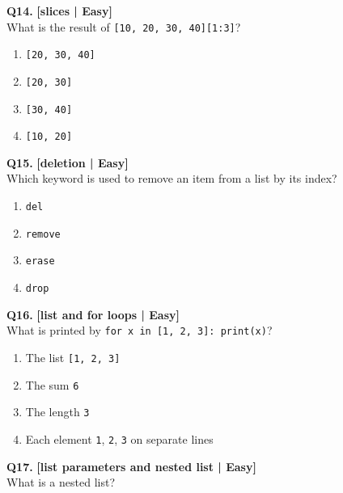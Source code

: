 \noindent\textbf{Q14.} \hfill {\small\color{LPUOrange}\textbf{[slices | Easy]}}\\[2pt]
What is the result of \texttt{[10, 20, 30, 40][1:3]}?

\begin{enumerate}[label=(\alph*),topsep=2pt,itemsep=1pt,partopsep=0pt,parsep=0pt]
    \item \relax \texttt{[20, 30, 40]}
    \item \relax \texttt{[20, 30]}
    \item \relax \texttt{[30, 40]}
    \item \relax \texttt{[10, 20]}
\end{enumerate}
\vspace{2mm}

\noindent\textbf{Q15.} \hfill {\small\color{LPUOrange}\textbf{[deletion | Easy]}}\\[2pt]
Which keyword is used to remove an item from a list by its index?

\begin{enumerate}[label=(\alph*),topsep=2pt,itemsep=1pt,partopsep=0pt,parsep=0pt]
    \item \relax \texttt{del}
    \item \relax \texttt{remove}
    \item \relax \texttt{erase}
    \item \relax \texttt{drop}
\end{enumerate}
\vspace{2mm}

\noindent\textbf{Q16.} \hfill {\small\color{LPUOrange}\textbf{[list and for loops | Easy]}}\\[2pt]
What is printed by \texttt{for x in [1, 2, 3]: print(x)}?

\begin{enumerate}[label=(\alph*),topsep=2pt,itemsep=1pt,partopsep=0pt,parsep=0pt]
    \item \relax The list \texttt{[1, 2, 3]}
    \item \relax The sum \texttt{6}
    \item \relax The length \texttt{3}
    \item \relax Each element \texttt{1}, \texttt{2}, \texttt{3} on separate lines
\end{enumerate}
\vspace{2mm}

\noindent\textbf{Q17.} \hfill {\small\color{LPUOrange}\textbf{[list parameters and nested list | Easy]}}\\[2pt]
What is a nested list?

